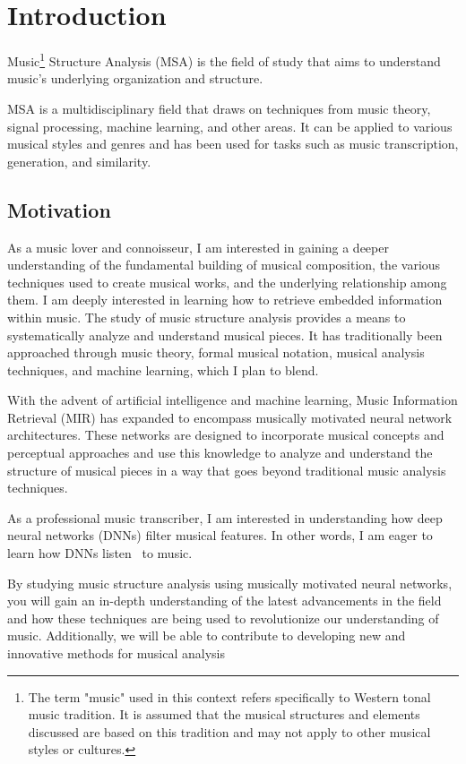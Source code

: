 \normallinespacing

\chapter{Introduction}

Music\footnote{The term "music" used in this context refers specifically to Western tonal music tradition. It is assumed that the musical structures and elements discussed are based on this tradition and may not apply to other musical styles or cultures.} Structure Analysis (MSA) is the field of study that aims to understand music's underlying organization and structure.

MSA is a multidisciplinary field that draws on techniques from music theory, signal processing, machine learning, and other areas. It can be applied to various musical styles and genres and has been used for tasks such as music transcription, generation, and similarity. 

\section{Motivation}

As a music lover and connoisseur, I am interested in gaining a deeper understanding of the fundamental building of musical composition, the various techniques used to create musical works, and the underlying relationship among them. I am deeply interested in learning how to retrieve embedded information within music. The study of music structure analysis provides a means to systematically analyze and understand musical pieces. It has traditionally been approached through music theory, formal musical notation, musical analysis techniques, and machine learning, which I plan to blend.

With the advent of artificial intelligence and machine learning, Music Information Retrieval (MIR) has expanded to encompass musically motivated neural network architectures. These networks are designed to incorporate musical concepts and perceptual approaches and use this knowledge to analyze and understand the structure of musical pieces in a way that goes beyond traditional music analysis techniques.

As a professional music transcriber, I am interested in understanding how deep neural networks (DNNs) filter musical features. In other words, I am eager to learn how DNNs listen~\cite{7500246} to music.

By studying music structure analysis using musically motivated neural networks, you will gain an in-depth understanding of the latest advancements in the field and how these techniques are being used to revolutionize our understanding of music. Additionally, we will be able to contribute to developing new and innovative methods for musical analysis~\cite{Huang2019MusicTG}

